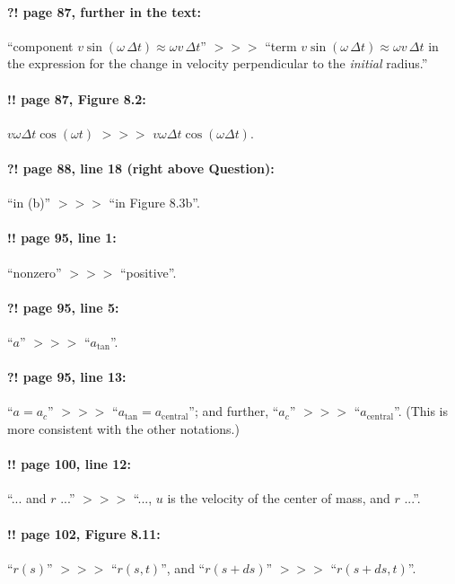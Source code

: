 \documentclass[twoside]{article}
\begin{document}
\paragraph{?! page 87, further in the text:} “component $v \sin(\omega \,\Delta t) \approx \omega v \,\Delta t$” $>\!>\!>$ “term $v \sin(\omega \,\Delta t) \approx \omega v \,\Delta t$ in the expression for the change in velocity perpendicular to the \emph{initial} radius.”

\paragraph{!! page 87, Figure 8.2:} $v\omega\Delta t\cos(\omega t)$ $>\!>\!>$ $v\omega\Delta t\cos(\omega \Delta t)$.

\paragraph{?! page 88, line 18 (right above Question):} “in (b)” $>\!>\!>$ “in Figure 8.3b”.

\paragraph{!! page 95, line 1:} “nonzero” $>\!>\!>$ “positive”.

\paragraph{?! page 95, line 5:} “$a$” $>\!>\!>$ “$a_{\mathrm{tan}}$”.

\paragraph{?! page 95, line 13:} “$a=a_c$” $>\!>\!>$ “$a_{\mathrm{tan}} = a_{\mathrm{central}}$”; and further,
“$a_c$” $>\!>\!>$ “$a_{\mathrm{central}}$”. (This is more consistent with the other notations.)

\paragraph{!! page 100, line 12:} “... and $r$ ...” $>\!>\!>$ “..., $u$ is the velocity of the center of mass, and $r$ ...”.

\paragraph{!! page 102, Figure 8.11:} “$r(s)$” $>\!>\!>$ “$r(s,t)$”,
and “$r(s+ds)$” $>\!>\!>$ “$r(s+ds,t)$”.
\end{document}

